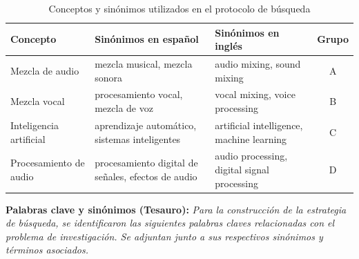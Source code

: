 \documentclass[12pt]{article}
\begin{document}
\begin{table}[h!]
\centering
\caption{Conceptos y sinónimos utilizados en el protocolo de búsqueda}
\label{tab:protocolo_busqueda}
\begin{tabular}{|p{2.7cm}|p{3.3cm}|p{3.3cm}|c|}
\hline
\textbf{Concepto} & \textbf{Sinónimos en español} & \textbf{Sinónimos en inglés} & \textbf{Grupo} \\
\hline
Mezcla de audio & mezcla musical, mezcla sonora & audio mixing, sound mixing & A \\
\hline
Mezcla vocal & procesamiento vocal, mezcla de voz & vocal mixing, voice processing & B \\
\hline
Inteligencia artificial & aprendizaje automático, sistemas inteligentes & artificial intelligence, machine learning & C \\
\hline
Procesamiento de audio & procesamiento digital de señales, efectos de audio & audio processing, digital signal processing & D \\
\hline
\end{tabular}
\end{table}

\textbf{Palabras clave y sinónimos (Tesauro):} \textit{Para la construcción de la estrategia de búsqueda, se identificaron las siguientes palabras claves relacionadas con el problema de investigación. Se adjuntan junto a sus respectivos sinónimos y términos asociados.}
\end{document}
